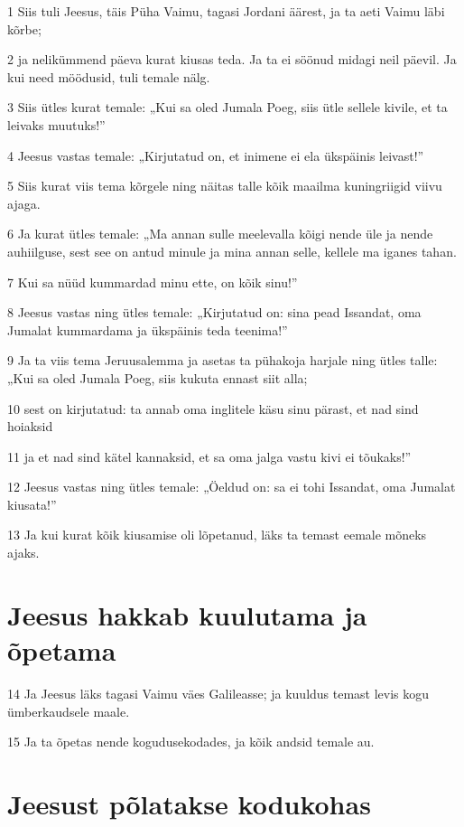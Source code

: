 \par 1 Siis tuli Jeesus, täis Püha Vaimu, tagasi Jordani äärest, ja ta aeti Vaimu läbi kõrbe;
\par 2 ja nelikümmend päeva kurat kiusas teda. Ja ta ei söönud midagi neil päevil. Ja kui need möödusid, tuli temale nälg.
\par 3 Siis ütles kurat temale: „Kui sa oled Jumala Poeg, siis ütle sellele kivile, et ta leivaks muutuks!”
\par 4 Jeesus vastas temale: „Kirjutatud on, et inimene ei ela ükspäinis leivast!”
\par 5 Siis kurat viis tema kõrgele ning näitas talle kõik maailma kuningriigid viivu ajaga.
\par 6 Ja kurat ütles temale: „Ma annan sulle meelevalla kõigi nende üle ja nende auhiilguse, sest see on antud minule ja mina annan selle, kellele ma iganes tahan.
\par 7 Kui sa nüüd kummardad minu ette, on kõik sinu!”
\par 8 Jeesus vastas ning ütles temale: „Kirjutatud on: sina pead Issandat, oma Jumalat kummardama ja ükspäinis teda teenima!”
\par 9 Ja ta viis tema Jeruusalemma ja asetas ta pühakoja harjale ning ütles talle: „Kui sa oled Jumala Poeg, siis kukuta ennast siit alla;
\par 10 sest on kirjutatud: ta annab oma inglitele käsu sinu pärast, et nad sind hoiaksid
\par 11 ja et nad sind kätel kannaksid, et sa oma jalga vastu kivi ei tõukaks!”
\par 12 Jeesus vastas ning ütles temale: „Öeldud on: sa ei tohi Issandat, oma Jumalat kiusata!”
\par 13 Ja kui kurat kõik kiusamise oli lõpetanud, läks ta temast eemale mõneks ajaks.

\section*{Jeesus hakkab kuulutama ja õpetama}

\par 14 Ja Jeesus läks tagasi Vaimu väes Galileasse; ja kuuldus temast levis kogu ümberkaudsele maale.
\par 15 Ja ta õpetas nende kogudusekodades, ja kõik andsid temale au.

\section*{Jeesust põlatakse kodukohas}


